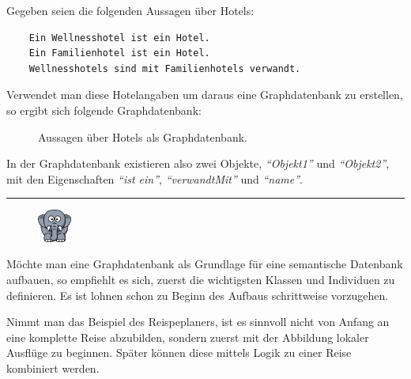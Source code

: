 \newpage

Gegeben seien die folgenden Aussagen über Hotels:
\begin{lstlisting}
    Ein Wellnesshotel ist ein Hotel.
    Ein Familienhotel ist ein Hotel.
    Wellnesshotels sind mit Familienhotels verwandt.
\end{lstlisting}

Verwendet man diese Hotelangaben um daraus eine Graphdatenbank zu erstellen, so ergibt sich folgende Graphdatenbank:
\begin{figure}[htbp]
\centering {}
\caption{Aussagen über Hotels als Graphdatenbank.\label{fig:hotels_graphdatenbank}\protect\footnotemark}
\end{figure}

In der Graphdatenbank existieren also zwei Objekte, \textit{``Objekt1''} und \textit{``Objekt2''}, mit den Eigenschaften \textit{``ist ein''}, \textit{``verwandtMit''} und \textit{``name''}.

\newpage

\noindent\rule[1ex]{\textwidth}{1pt}
\begin{figure}
    \vspace{-12pt}
    \includegraphics[width=0.1\textwidth]{bilder/elephant.png}
\end{figure}
\label{elephant_graph_data}
Möchte man eine Graphdatenbank als Grundlage für eine semantische Datenbank aufbauen, so empfiehlt es sich, zuerst die wichtigsten Klassen und Individuen zu definieren. Es ist lohnen schon zu Beginn des Aufbaus schrittweise vorzugehen.

Nimmt man das Beispiel des Reispeplaners, ist es sinnvoll nicht von Anfang an eine komplette Reise abzubilden, sondern zuerst mit der Abbildung lokaler Ausflüge zu beginnen. Später können diese mittels Logik zu einer Reise kombiniert werden.

